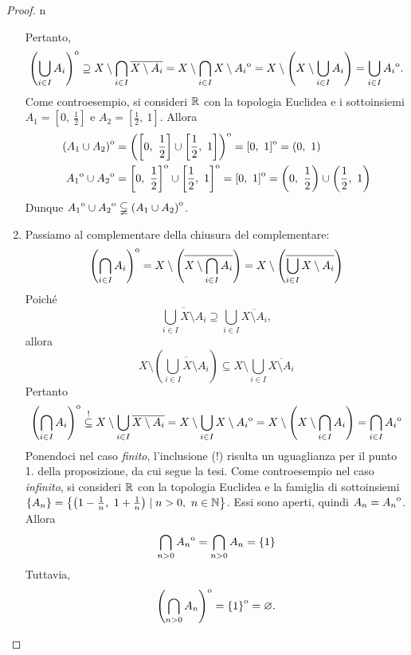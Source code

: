 \begin{proof}{n}
\begin{enumerate}[label=\Roman*]
Pertanto,
\begin{equation*}
{\kern0pt\left(\bigcup_{i\in I}A_i\right)}^{\mathrm{o}}\supseteq X\setminus\bigcap_{i\in I}\overline{X\setminus A_i}=X\setminus\bigcap_{i\in I}X\setminus {\kern0ptA_i}^{\mathrm{o}}=X\setminus\left(X\setminus\bigcup_{i\in I}A_i \right)=\bigcup_{i\in I}{\kern0ptA_i}^{\mathrm{o}}.
\end{equation*}
Come controesempio, si consideri $\mathbb{R}$ con la topologia Euclidea e i sottoinsiemi $A_1=\left[0,\ \frac{1}{2}\right]$ e $A_2=\left[\frac{1}{2},\ 1\right]$. Allora
\begin{align*}
		\interior{\left(A_1\cup A_2\right)}&=\interior{\left(\left[0,\ \frac{1}{2}\right]\cup\left[\frac{1}{2},\ 1\right]\right)}=\interior{\left[0,\ 1\right]}=\left(0,\ 1\right)\\
		\interior{A_1}\cup \interior{A_2}&=\interior{\left[0,\ \frac{1}{2}\right]}\cup\interior{\left[\frac{1}{2},\ 1\right]}=\interior{\left[0,\ 1\right]}=\left(0,\ \frac{1}{2}\right)\cup\left(\frac{1}{2},\ 1\right)
\end{align*}
Dunque ${\kern0ptA_1}^{\mathrm{o}}\cup {\kern0ptA_2}^{\mathrm{o}}\subsetneqq{\kern0pt\left(A_1\cup A_2\right)}^{\mathrm{o}}$.
\item Passiamo al complementare della chiusura del complementare:
\begin{equation*}
{\kern0pt\left(\bigcap_{i\in I}A_i\right)}^{\mathrm{o}}=X\setminus\left(\overline{X\setminus \bigcap_{i\in I}A_i}\right)=X\setminus\left(\overline{\bigcup_{i\in I}X\setminus A_i}\right)
\end{equation*}
Poiché
\begin{equation*}
	\overline{\bigcup_{i\in I}X\setminus A_i}\supseteq \bigcup_{i\in I}\overline{X\setminus A_i},
\end{equation*}
allora
\begin{equation*}
	X\setminus\left(\overline{\bigcup_{i\in I}X\setminus A_i}\right) \subseteq X\setminus\bigcup_{i\in I}\overline{X\setminus A_i}
\end{equation*}
Pertanto
\begin{equation*}
		{\kern0pt\left(\bigcap_{i\in I}A_i\right)}^{\mathrm{o}}\stackrel{!}{\subseteq} X\setminus\bigcup_{i\in I}\overline{X\setminus A_i}=X\setminus\bigcup_{i\in I}X\setminus {\kern0ptA_i}^{\mathrm{o}} =X\setminus\left(X\setminus\bigcap_{i\in I}A_i \right)=\bigcap_{i\in I}{\kern0ptA_i}^{\mathrm{o}}
\end{equation*}
Ponendoci nel caso \textit{finito}, l'inclusione (!) risulta un uguaglianza per il punto 1. della proposizione, da cui segue la tesi. Come controesempio nel caso \textit{infinito}, si consideri $\mathbb{R}$ con la topologia Euclidea e la famiglia di sottoinsiemi $\left\{A_n\right\}=\left\{\left(1-\frac{1}{n},\ 1+\frac{1}{n}\right)\mid n> 0,\ n\in \N\right\}$. Essi sono aperti, quindi $A_n={\kern0ptA_n}^{\mathrm{o}}$. Allora
\begin{equation*}
	\bigcap_{n>0}{\kern0ptA_n}^{\mathrm{o}}=\bigcap_{n>0}A_n=\{1\}
\end{equation*}
Tuttavia, 
\begin{equation*}
	{\kern0pt\left(\bigcap_{n>0}A_n\right)}^{\mathrm{o}}={\kern0pt\{1\}}^{\mathrm{o}}=\varnothing.\qedhere
\end{equation*}
\end{enumerate}
\end{proof}
